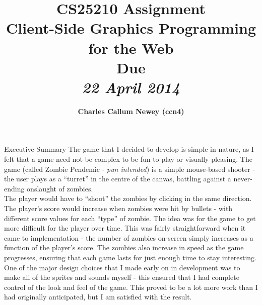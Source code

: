 \documentclass[11pt]{article}
\title{
\vspace{2in}
\textmd{\textbf{CS25210 Assignment \\ Client-Side Graphics Programming for the Web}}\\
\normalsize\vspace{0.1in}\small{Due}\\
\vspace{0.1in}\large{\textit{22 April 2014}}
\vspace{3in}
}
\author{\textbf{Charles Callum Newey (ccn4)}}
\date{}
\begin{document}
\maketitle
\newpage
\tableofcontents
\newpage

\begin{section}{Executive Summary}
    The game that I decided to develop is simple in nature, as I felt that a game need not be complex to be fun to play or visually pleasing. The game (called Zombie Pendemic - \textit{pun intended}) is a simple mouse-based shooter - the user plays as a ``turret'' in the centre of the canvas, battling against a never-ending onslaught of zombies. \\
    
    The player would have to ``shoot'' the zombies by clicking in the same direction. The player's score would increase when zombies were hit by bullets - with different score values for each ``type'' of zombie. The idea was for the game to get more difficult for the player over time. This was fairly straightforward when it came to implementation - the number of zombies on-screen simply increases as a function of the player's score. The zombies also increase in speed as the game progresses, ensuring that each game lasts for just enough time to stay interesting. \\
    
    One of the major design choices that I made early on in development was to make all of the sprites and sounds myself - this ensured that I had complete control of the look and feel of the game. This proved to be a lot more work than I had originally anticipated, but I am satisfied with the result.
\end{section}
\end{document}
